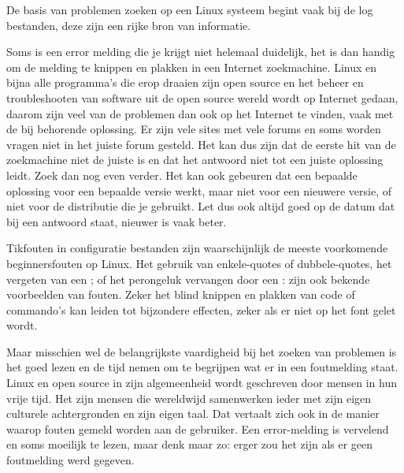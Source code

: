 De basis van problemen zoeken op een Linux systeem begint vaak bij de log bestanden, deze zijn een rijke bron van informatie.

Soms is een error melding die je krijgt niet helemaal duidelijk, het is dan handig om de melding te knippen en plakken in een Internet zoekmachine. Linux en bijna alle programma's die erop draaien zijn open source en het beheer en troubleshooten van software uit de open source wereld wordt op Internet gedaan, daarom zijn veel van de problemen dan ook op het Internet te vinden, vaak met de bij behorende oplossing. Er zijn vele sites met vele forums en soms worden vragen niet in het juiste forum gesteld. Het kan dus zijn dat de eerste hit van de zoekmachine niet de juiste is en dat het antwoord niet tot een juiste oplossing leidt. Zoek dan nog even verder. Het kan ook gebeuren dat een bepaalde oplossing voor een bepaalde versie werkt, maar niet voor een nieuwere versie, of niet voor de distributie die je gebruikt. Let dus ook altijd goed op de datum dat bij een antwoord staat, nieuwer is vaak beter.

Tikfouten in configuratie bestanden zijn waarschijnlijk de meeste voorkomende beginnersfouten op Linux. Het gebruik van enkele-quotes of dubbele-quotes, het vergeten van een ; of het perongeluk vervangen door een : zijn ook bekende voorbeelden van fouten. Zeker het blind knippen en plakken van code of commando's kan leiden tot bijzondere effecten, zeker als er niet op het font gelet wordt.

Maar misschien wel de belangrijkste vaardigheid bij het zoeken van problemen is het goed lezen en de tijd nemen om te begrijpen wat er in een foutmelding staat. Linux en open source in zijn algemeenheid wordt geschreven door mensen in hun vrije tijd. Het zijn mensen die wereldwijd samenwerken ieder met zijn eigen culturele achtergronden en zijn eigen taal. Dat vertaalt zich ook in de manier waarop fouten gemeld worden aan de gebruiker. Een error-melding is vervelend en soms moeilijk te lezen, maar denk maar zo: erger zou het zijn als er geen foutmelding werd gegeven.

